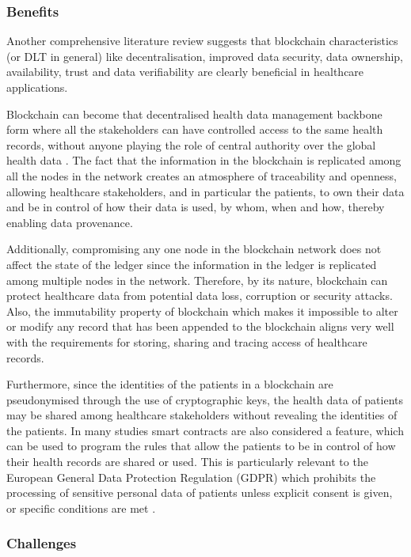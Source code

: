 \subsubsection{Benefits}
\label{sssec:benefits}

Another comprehensive literature review \cite{agbo2019blockchain} suggests that blockchain characteristics (or DLT in general) like decentralisation, improved data security, data ownership, availability, trust and data verifiability are clearly beneficial in healthcare applications. 

Blockchain can become that decentralised health data management backbone form where all the stakeholders can have controlled access to the same health records, without anyone playing the role of central authority over the global health data \cite[p.7]{agbo2019blockchain}. The fact that the information in the blockchain is replicated among all the nodes in the network creates an atmosphere of traceability and openness, allowing healthcare stakeholders, and in particular the patients, to own their data and be in control of how their data is used, by whom, when and how, thereby enabling data provenance.

Additionally, compromising any one node in the blockchain network does not affect the state of the ledger since the information in the ledger is replicated among multiple nodes in the network. Therefore, by its nature, blockchain can protect healthcare data from potential data loss, corruption or security attacks. Also, the immutability property of blockchain which makes it impossible to alter or modify any record that has been appended to the blockchain aligns very well with the requirements for storing, sharing and tracing access of healthcare records. 

Furthermore, since the identities of the patients in a blockchain are pseudonymised through the use of cryptographic keys, the health data of patients may be shared among healthcare stakeholders without revealing the identities of the patients. In many studies smart contracts are also considered a feature, which can be used to program the rules that allow the patients to be in control of how their health records are shared or used. This is particularly relevant to the European General Data Protection Regulation (GDPR) which prohibits the processing of sensitive personal data of patients unless explicit consent is given, or specific conditions are met \cite{foglia2020patients}.

\subsubsection{Challenges}
\label{sssec:challenges}

